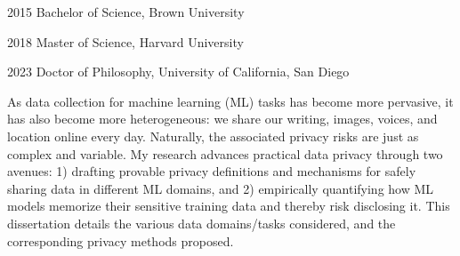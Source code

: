 \documentclass[12pt]{ucsddissertation}
\begin{document}
\begin{vita}
\noindent
\begin{cv}{}
\begin{cvlist}{}
\item[2015] Bachelor of Science, Brown University
\item[2018] Master of Science, Harvard University
\item[2023] Doctor of Philosophy, University of California, San Diego
\end{cvlist}
\end{cv}


\end{vita}

\begin{dissertationabstract}
As data collection for machine learning (ML) tasks has become more pervasive, it has also become more heterogeneous: we share our writing, images, voices, and location online every day. Naturally, the associated privacy risks are just as complex and variable. My research advances practical data privacy through two avenues: 1) drafting provable privacy definitions and mechanisms for safely sharing data in different ML domains, and 2) empirically quantifying how ML models memorize their sensitive training data and thereby risk disclosing it. This dissertation details the various data domains/tasks considered, and the corresponding privacy methods proposed. 
\end{dissertationabstract}
\end{document}
